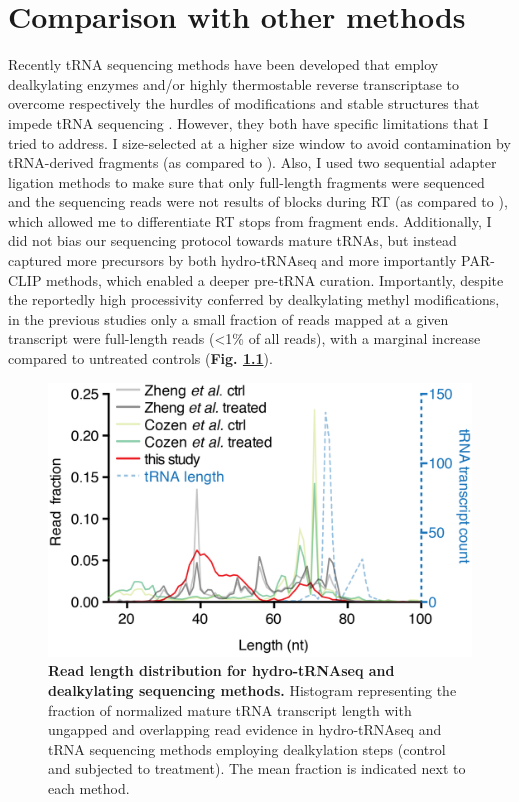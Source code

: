 \documentclass[12pt]{rockefeller}
\begin{document}
\chapter{Comparison with other methods}

Recently tRNA sequencing methods have been developed that employ dealkylating enzymes and/or highly thermostable reverse transcriptase to overcome respectively the hurdles of modifications and stable structures that impede tRNA sequencing \cite{Cozen:2015ds, Zheng:2015dw}. However, they both have specific limitations that I tried to address. I size-selected at a higher size window to avoid contamination by tRNA-derived fragments (as compared to \cite{Cozen:2015ds}). Also, I used two sequential adapter ligation methods to make sure that only full-length fragments were sequenced and the sequencing reads were not results of blocks during RT (as compared to \cite{Zheng:2015dw}), which allowed me to differentiate RT stops from fragment ends. Additionally, I did not bias our sequencing protocol towards mature tRNAs, but instead captured more precursors by both hydro-tRNAseq and more importantly PAR-CLIP methods, which enabled a deeper pre-tRNA curation. Importantly, despite the reportedly high processivity conferred by dealkylating methyl modifications, in the previous studies only a small fraction of reads mapped at a given transcript were full-length reads (<1\% of all reads), with a marginal increase compared to untreated controls (\textbf{Fig. \ref{supp6}}). 

\begin{figure}[!ht]%
\centering
\includegraphics{supp6.png}%
\caption[Read length distribution for hydro-tRNAseq and dealkylating sequencing methods.]
{\textbf{Read length distribution for hydro-tRNAseq and dealkylating sequencing methods.}
Histogram representing the fraction of normalized mature tRNA transcript length with ungapped and overlapping read evidence in hydro-tRNAseq and tRNA sequencing methods employing dealkylation steps (control and subjected to treatment). The mean fraction is indicated next to each method.}
\centering
\label{supp6}%
\end{figure}
\end{document}
